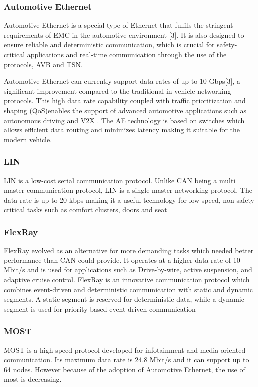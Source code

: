 \documentclass{report}
\begin{document}
\subsubsection{Automotive Ethernet}
Automotive Ethernet is a special type of Ethernet that fulfils the stringent requirements of EMC in the automotive environment [3]. It is also designed to ensure reliable and deterministic communication, which is crucial for safety-critical applications and real-time communication through the use of the protocols, AVB and TSN.

Automotive Ethernet can currently support data rates of up to 10 Gbps[3], a significant improvement compared to the traditional in-vehicle networking protocols. This high data rate capability coupled with traffic prioritization and shaping (QoS)enables the support of advanced automotive applications such as autonomous driving and V2X . The AE technology is based on switches which allows efficient data routing and minimizes latency making it suitable for the modern vehicle.

\subsubsection{LIN}
LIN is a low-cost serial communication protocol. Unlike CAN being a multi master communication protocol, LIN is a single master networking protocol. The data rate is up to 20 kbps making it a useful technology for low-speed, non-safety critical tasks such as comfort clusters, doors and seat

\subsubsection{FlexRay}
FlexRay evolved as an alternative for more demanding tasks which needed better performance than CAN could provide. It operates at a higher data rate of 10 Mbit/s and is used for applications such as Drive-by-wire, active suspension, and adaptive cruise control. FlexRay is an innovative communication protocol which combines event-driven and deterministic communication with static and dynamic segments. A static segment is reserved for deterministic data, while a dynamic segment is used for priority based event-driven communication
\subsubsection{MOST}
MOST is a high-speed protocol developed for infotainment and media oriented communication. Its maximum data rate is 24.8 Mbit/s and it can support up to 64 nodes. However because of the adoption of Automotive Ethernet, the use of most is decreasing.
\end{document}
